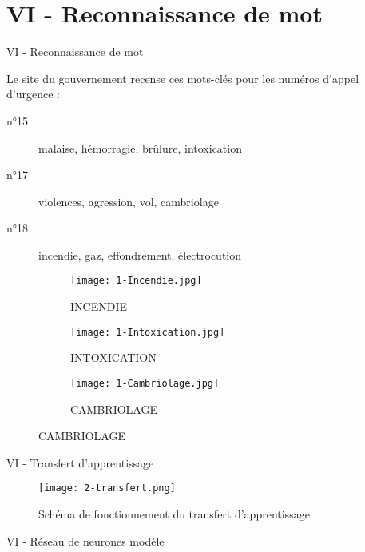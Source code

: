 
\section{VI - Reconnaissance de mot}
\begin{frame}{VI - Reconnaissance de mot}
	\begin{block}{}
		Le site du gouvernement recense ces mots-clés pour les numéros d'appel d'urgence : \\
		\begin{description}
			\item[n°15] malaise, hémorragie, brûlure, intoxication
			\item[n°17] violences, agression, vol, cambriolage
			\item[n°18] incendie, gaz, effondrement, électrocution
		\end{description}
	\end{block}
	\begin{figure}
		\begin{subfigure}[]{0.3\textwidth}
			\texttt{[image: 1-Incendie.jpg]}
			\caption{INCENDIE}
		\end{subfigure}
		\begin{subfigure}[]{0.3\textwidth}
			\texttt{[image: 1-Intoxication.jpg]}
			\caption{INTOXICATION}
		\end{subfigure}
		\begin{subfigure}[]{0.3\textwidth}
			\texttt{[image: 1-Cambriolage.jpg]}
			\caption{CAMBRIOLAGE}
		\end{subfigure}
	\end{figure}
\end{frame}


\begin{frame}{VI - Transfert d'apprentissage}
	\begin{figure}
		\texttt{[image: 2-transfert.png]}
		\caption{Schéma de fonctionnement du transfert d'apprentissage}
	\end{figure}
\end{frame}


\begin{frame}{VI - Réseau de neurones modèle}
	
\end{frame}


